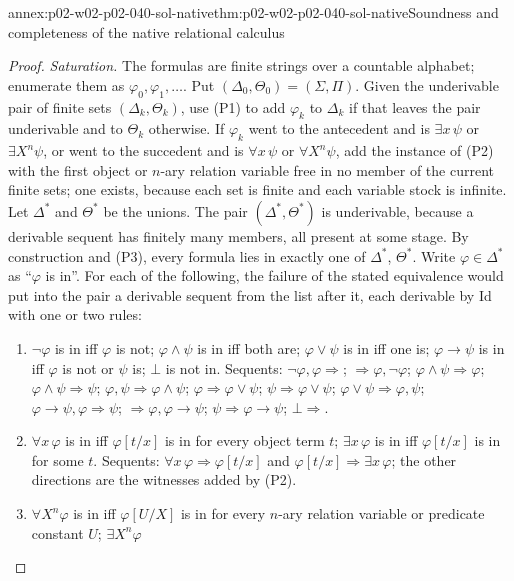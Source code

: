 \begin{annexitem}{annex:p02-w02-p02-040-sol-native}{thm:p02-w02-p02-040-sol-native}{Soundness and completeness of the native relational calculus}
\begin{proof}
\emph{Saturation.}  The formulas are finite strings over a countable
alphabet; enumerate them as \(\varphi_0,\varphi_1,\ldots\).  Put
\((\Delta_0,\Theta_0)=(\Sigma,\Pi)\).  Given the underivable pair of finite sets
\((\Delta_k,\Theta_k)\), use (P1) to add \(\varphi_k\) to \(\Delta_k\) if that
leaves the pair underivable and to \(\Theta_k\) otherwise.  If \(\varphi_k\)
went to the antecedent and is \(\exists x\,\psi\) or \(\exists X^n\psi\), or went
to the succedent and is \(\forall x\,\psi\) or \(\forall X^n\psi\), add the
instance of (P2) with the first object or \(n\)-ary relation variable free in
no member of the current finite sets; one exists, because each set is
finite and each variable stock is infinite.  Let \(\Delta^*\) and
\(\Theta^*\) be the unions.  The pair \((\Delta^*,\Theta^*)\) is underivable,
because a derivable sequent has finitely many members, all present at some
stage.  By construction and (P3), every formula lies in exactly one of
\(\Delta^*\), \(\Theta^*\).  Write \(\varphi\in\Delta^*\) as ``\(\varphi\) is in''.
For each of the following, the failure of the stated equivalence would put
into the pair a derivable sequent from the list after it, each derivable by
Id with one or two rules:
\begin{enumerate}
 \item[(H1)] \(\neg\varphi\) is in iff \(\varphi\) is not; \(\varphi\land\psi\) is in
   iff both are; \(\varphi\lor\psi\) is in iff one is; \(\varphi\to\psi\) is in iff
   \(\varphi\) is not or \(\psi\) is; \(\bot\) is not in.  Sequents:
   \(\neg\varphi,\varphi\Rightarrow\); \(\Rightarrow\varphi,\neg\varphi\);
   \(\varphi\land\psi\Rightarrow\varphi\); \(\varphi\land\psi\Rightarrow\psi\);
   \(\varphi,\psi\Rightarrow\varphi\land\psi\); \(\varphi\Rightarrow\varphi\lor\psi\);
   \(\psi\Rightarrow\varphi\lor\psi\); \(\varphi\lor\psi\Rightarrow\varphi,\psi\);
   \(\varphi\to\psi,\varphi\Rightarrow\psi\); \(\Rightarrow\varphi,\varphi\to\psi\);
   \(\psi\Rightarrow\varphi\to\psi\); \(\bot\Rightarrow\).
 \item[(H2)] \(\forall x\,\varphi\) is in iff \(\varphi[t/x]\) is in for every
   object term \(t\); \(\exists x\,\varphi\) is in iff \(\varphi[t/x]\) is in for
   some \(t\).  Sequents: \(\forall x\,\varphi\Rightarrow\varphi[t/x]\) and
   \(\varphi[t/x]\Rightarrow\exists x\,\varphi\); the other directions are the
   witnesses added by (P2).
 \item[(H3)] \(\forall X^n\varphi\) is in iff \(\varphi[U/X]\) is in for every
   \(n\)-ary relation variable or predicate constant \(U\); \(\exists X^n\varphi\)

\end{enumerate}
\end{proof}
\end{annexitem}
